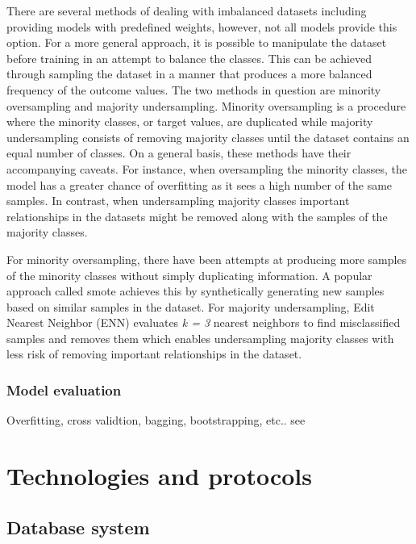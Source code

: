 There are several methods of dealing with imbalanced datasets including providing models with predefined weights, however, not all models provide this option. For a more general approach, it is possible to manipulate the dataset before training in an attempt to balance the classes. This can be achieved through sampling the dataset in a manner that produces a more balanced frequency of the outcome values. The two methods in question are minority oversampling and majority undersampling. Minority oversampling is a procedure where the minority classes, or target values, are duplicated while majority undersampling consists of removing majority classes until the dataset contains an equal number of classes. On a general basis, these methods have their accompanying caveats. For instance, when oversampling the minority classes, the model has a greater chance of overfitting as it sees a high number of the same samples. In contrast, when undersampling majority classes important relationships in the datasets might be removed along with the samples of the majority classes.

For minority oversampling, there have been attempts at producing more samples of the minority classes without simply duplicating information. A popular approach called \acrfull{smote} achieves this by synthetically generating new samples based on similar samples in the dataset. For majority undersampling, Edit Nearest Neighbor (ENN) evaluates \textit{k = 3} nearest neighbors to find misclassified samples and removes them which enables undersampling majority classes with less risk of removing important relationships in the dataset.

\subsubsection{Model evaluation}
\label{sec:model_evaluation}


Overfitting, cross validtion, bagging, bootstrapping, etc.. see \cite{ghojogh2019theory}

\section{Technologies and protocols}

\subsection{Database system}

